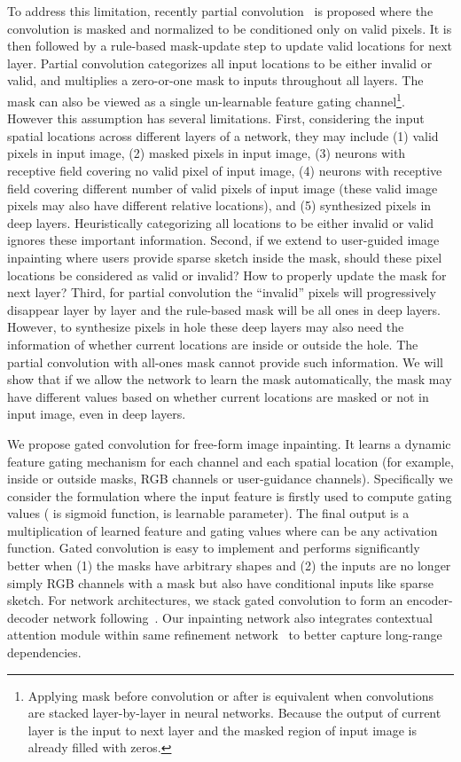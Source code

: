 \documentclass[10pt,twocolumn,letterpaper]{article}
\begin{document}
To address this limitation, recently partial convolution~\cite{liu2018image} is proposed where the convolution is masked and normalized to be conditioned only on valid pixels. It is then followed by a rule-based mask-update step to update valid locations for next layer. Partial convolution categorizes all input locations to be either invalid or valid, and multiplies a zero-or-one mask to inputs throughout all layers. The mask can also be viewed as a single un-learnable feature gating channel\footnote{Applying mask before convolution or after is equivalent when convolutions are stacked layer-by-layer in neural networks. Because the output of current layer is the input to next layer and the masked region of input image is already filled with zeros.}. However this assumption has several limitations. First, considering the input spatial locations across different layers of a network, they may include (1) valid pixels in input image, (2) masked pixels in input image, (3) neurons with receptive field covering no valid pixel of input image, (4) neurons with receptive field covering different number of valid pixels of input image (these valid image pixels may also have different relative locations), and (5) synthesized pixels in deep layers. Heuristically categorizing all locations to be either invalid or valid ignores these important information. Second, if we extend to user-guided image inpainting where users provide sparse sketch inside the mask, should these pixel locations be considered as valid or invalid? How to properly update the mask for next layer? Third, for partial convolution the ``invalid'' pixels will progressively disappear layer by layer and the rule-based mask will be all ones in deep layers. However, to synthesize pixels in hole these deep layers may also need the information of whether current locations are inside or outside the hole. The partial convolution with all-ones mask cannot provide such information. We will show that if we allow the network to learn the mask automatically, the mask may have different values based on whether current locations are masked or not in input image, even in deep layers.

We propose gated convolution for free-form image inpainting. It learns a dynamic feature gating mechanism for each channel and each spatial location (for example, inside or outside masks, RGB channels or user-guidance channels). Specifically we consider the formulation where the input feature is firstly used to compute gating values  ( is sigmoid function,  is learnable parameter). The final output is a multiplication of learned feature and gating values  where  can be any activation function. Gated convolution is easy to implement and performs significantly better when (1) the masks have arbitrary shapes and (2) the inputs are no longer simply RGB channels with a mask but also have conditional inputs like sparse sketch. For network architectures, we stack gated convolution to form an encoder-decoder network following~\cite{yu2018generative}. Our inpainting network also integrates contextual attention module within same refinement network~\cite{yu2018generative} to better capture long-range dependencies.
\end{document}

